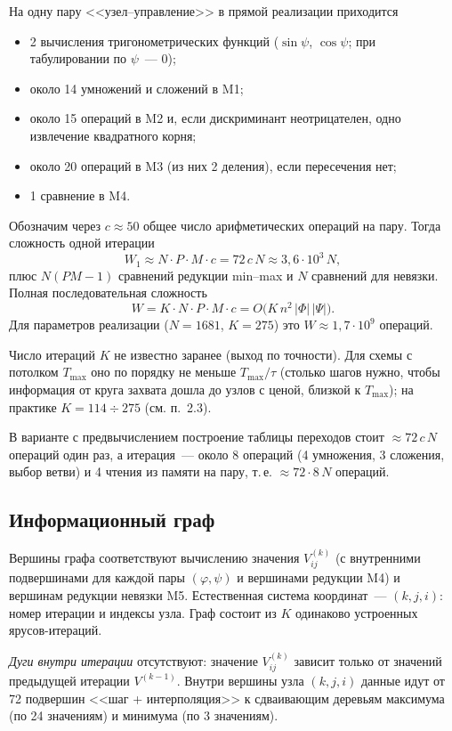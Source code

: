 \documentclass[14pt,a4paper]{extarticle}
\newcommand{\Tmax}{T_{\max}}
\begin{document}
На одну пару <<узел--управление>> в прямой реализации приходится
\begin{itemize}
	\item 2 вычисления тригонометрических функций ($\sin\psi$, $\cos\psi$;
	при табулировании по $\psi$~--- 0);
	\item около 14 умножений и сложений в M1;
	\item около 15 операций в M2 и, если дискриминант неотрицателен, одно
	извлечение квадратного корня;
	\item около 20 операций в M3 (из них 2 деления), если пересечения нет;
	\item 1 сравнение в M4.
\end{itemize}
Обозначим через $c\approx 50$ общее число арифметических операций на
пару. Тогда сложность одной итерации
\[
	W_1 \approx N\cdot P\cdot M\cdot c = 72\,c\,N \approx 3{,}6\cdot10^{3}\,N,
\]
плюс $N(PM-1)$ сравнений редукции min--max и $N$ сравнений для невязки.
Полная последовательная сложность
\[
	W = K\cdot N\cdot P\cdot M\cdot c = O\bigl(K\,n^2\,|\Phi|\,|\Psi|\bigr).
\]
Для параметров реализации ($N=1681$, $K=275$) это $W\approx 1{,}7\cdot 10^{9}$
операций.

Число итераций $K$ не известно заранее (выход по точности). Для схемы
с потолком $\Tmax$ оно по порядку не меньше $\Tmax/\tau$ (столько шагов
нужно, чтобы информация от круга захвата дошла до узлов с ценой,
близкой к $\Tmax$); на практике $K=114\div 275$ (см. п.~2.3).

В варианте с предвычислением построение таблицы переходов стоит
$\approx 72\,c\,N$ операций один раз, а итерация~--- около 8 операций
(4 умножения, 3 сложения, выбор ветви) и 4 чтения из памяти на пару, т.\,е.
$\approx 72\cdot 8\,N$ операций.

\subsection{Информационный граф}

Вершины графа соответствуют вычислению значения
$V^{(k)}_{ij}$ (с внутренними подвершинами для каждой пары
$(\varphi,\psi)$ и вершинами редукции M4) и вершинам редукции невязки M5.
Естественная система координат~--- $(k,j,i)$: номер итерации и индексы
узла. Граф состоит из $K$ одинаково устроенных ярусов-итераций.

\emph{Дуги внутри итерации} отсутствуют: значение $V^{(k)}_{ij}$
зависит только от значений предыдущей итерации $V^{(k-1)}$. Внутри
вершины узла $(k,j,i)$ данные идут от 72 подвершин <<шаг + интерполяция>>
к сдваивающим деревьям максимума (по 24 значениям) и минимума (по 3
значениям).
\end{document}
